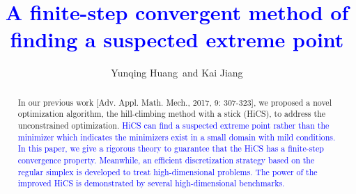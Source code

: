 \documentclass[mathpazo]{csam}
\theoremstyle{remark}
\begin{document}
	\title[HiCS]{\textcolor{blue}{A finite-step convergent method 
	of finding a suspected extreme point}}

	
	\author[Y. Huang and K. Jiang]{
	Yunqing Huang\corrauth~and Kai Jiang }
	\address
	{ \ School of Mathematics and Computational Science, 
		Hunan Key Laboratory for Computation and Simulation in Science and Engineering,
		Xiangtan University, Xiangtan, Hunan, 411105, China.}
	
	\begin{abstract}
In our previous work [Adv. Appl. Math. Mech., 2017, 9: 307-323],
we proposed a novel optimization algorithm, the hill-climbing method with a stick
(HiCS), to address the unconstrained optimization. 
\textcolor{blue}{
HiCS can find a suspected extreme point rather than the minimizer which
indicates the minimizers exist in a small domain with mild conditions.   
In this paper, we give a rigorous theory to guarantee that the HiCS has 
a finite-step convergence property.
Meanwhile, an efficient discretization strategy based on the regular simplex is
developed to treat high-dimensional problems. 
The power of the improved HiCS is demonstrated by several
high-dimensional benchmarks.
}
	\end{abstract}
	
	
\end{document}
